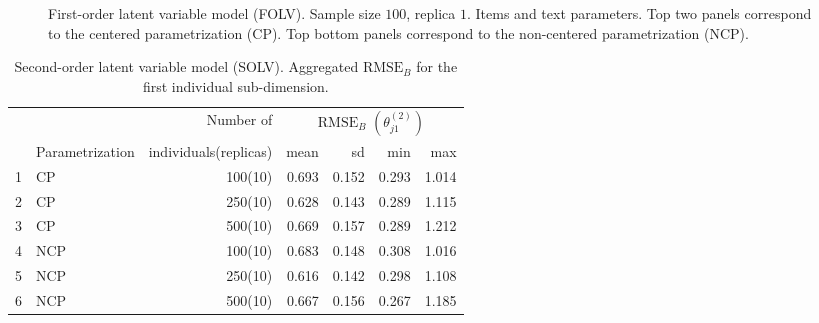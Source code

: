 %
\begin{figure}[H]
	\centering
	\begin{subfigure}
		\texttt{[image: FOLV\_CE\_J100\_Ndata1\_items]}
	\end{subfigure}
	\begin{subfigure}
		\texttt{[image: FOLV\_NC\_J100\_Ndata1\_items]}
	\end{subfigure}
	\caption[First-order latent variable model (FOLV). Sample size $100$, replica $1$. Items and text parameters.]%
	{First-order latent variable model (FOLV). Sample size $100$, replica $1$. Items and text parameters. Top two panels correspond to the centered parametrization (CP). Top bottom panels correspond to the non-centered parametrization (NCP).}
	\label{fig:FOLV_recovery2}
\end{figure}
%
\begin{table}[H]
	\centering
	\begin{tabular}{rlrrrrr}
		\hline
		\multicolumn{2}{c}{ } & Number of & \multicolumn{4}{c}{ $\text{RMSE}_{B}$ $( \theta^{(2)}_{j1} )$ } \\ 
		\cmidrule(rl){4-7}
		& Parametrization & individuals(replicas) & mean & sd & min & max \\  
		\hline\hline
		1 & CP &  100(10) & 0.693 & 0.152 & 0.293 & 1.014 \\
		2 & CP &  250(10) & 0.628 & 0.143 & 0.289 & 1.115 \\  
		3 & CP &  500(10) & 0.669 & 0.157 & 0.289 & 1.212 \\ 
		\hline
		4 & NCP &  100(10) & 0.683 & 0.148 & 0.308 & 1.016 \\ 
		5 & NCP &  250(10) & 0.616 & 0.142 & 0.298 & 1.108 \\ 
		6 & NCP &  500(10) & 0.667 & 0.156 & 0.267 & 1.185 \\
		\hline
	\end{tabular}
	\caption[Second-order latent variable model (SOLV). Aggregated $\text{RMSE}_{B}$ for the first individual sub-dimension.]%
	{Second-order latent variable model (SOLV). Aggregated $\text{RMSE}_{B}$ for the first individual sub-dimension.}
	\label{tab:SOLV_RMSE_theta1}
\end{table}
%
